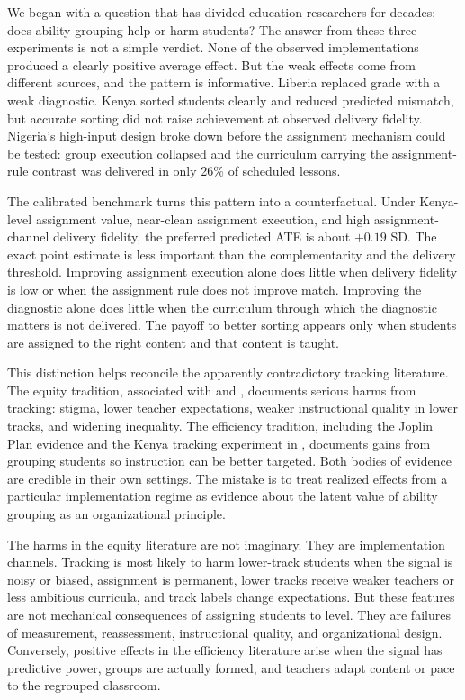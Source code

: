 \documentclass[11pt]{article}
\begin{document}
We began with a question that has divided education researchers for decades: does ability grouping help or harm students? The answer from these three experiments is not a simple verdict. None of the observed implementations produced a clearly positive average effect. But the weak effects come from different sources, and the pattern is informative. Liberia replaced grade with a weak diagnostic. Kenya sorted students cleanly and reduced predicted mismatch, but accurate sorting did not raise achievement at observed delivery fidelity. Nigeria's high-input design broke down before the assignment mechanism could be tested: group execution collapsed and the curriculum carrying the assignment-rule contrast was delivered in only 26\% of scheduled lessons.

The calibrated benchmark turns this pattern into a counterfactual. Under Kenya-level assignment value, near-clean assignment execution, and high assignment-channel delivery fidelity, the preferred predicted ATE is about $+0.19$ SD. The exact point estimate is less important than the complementarity and the delivery threshold. Improving assignment execution alone does little when delivery fidelity is low or when the assignment rule does not improve match. Improving the diagnostic alone does little when the curriculum through which the diagnostic matters is not delivered. The payoff to better sorting appears only when students are assigned to the right content and that content is taught.

This distinction helps reconcile the apparently contradictory tracking literature. The equity tradition, associated with \citet{oakes1985} and \citet{gamoran1992}, documents serious harms from tracking: stigma, lower teacher expectations, weaker instructional quality in lower tracks, and widening inequality. The efficiency tradition, including the Joplin Plan evidence and the Kenya tracking experiment in \citet{duflo2011peer}, documents gains from grouping students so instruction can be better targeted. Both bodies of evidence are credible in their own settings. The mistake is to treat realized effects from a particular implementation regime as evidence about the latent value of ability grouping as an organizational principle.

The harms in the equity literature are not imaginary. They are implementation channels. Tracking is most likely to harm lower-track students when the signal is noisy or biased, assignment is permanent, lower tracks receive weaker teachers or less ambitious curricula, and track labels change expectations. But these features are not mechanical consequences of assigning students to level. They are failures of measurement, reassessment, instructional quality, and organizational design. Conversely, positive effects in the efficiency literature arise when the signal has predictive power, groups are actually formed, and teachers adapt content or pace to the regrouped classroom.
\end{document}
